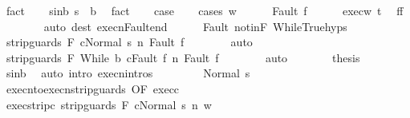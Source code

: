 \begin{isabellebody}
\ fact\isanewline
\ \ \isamarkupfalse%
\ s{\isacharunderscore}in{\isacharunderscore}b{\isacharcolon}\ {\isachardoublequoteopen}s\ {\isasymin}\ b{\isachardoublequoteclose}\ \isamarkupfalse%
\ fact\isanewline
\ \ \isamarkupfalse%
\ {\isacharquery}case\isanewline
\ \ \isamarkupfalse%
\ {\isacharparenleft}cases\ w{\isacharparenright}\isanewline
\ \ \ \ \isamarkupfalse%
\ {\isacharparenleft}Fault\ f{\isacharprime}{\isacharparenright}\isanewline
\ \ \ \ \isamarkupfalse%
\ exec{\isacharunderscore}w\ t\ \isamarkupfalse%
\ {\isachardoublequoteopen}f{\isacharprime}{\isacharequal}f{\isachardoublequoteclose}\isanewline
\ \ \ \ \ \ \isamarkupfalse%
\ {\isacharparenleft}auto\ dest{\isacharcolon}\ execn{\isacharunderscore}Fault{\isacharunderscore}end{\isacharparenright}\isanewline
\ \ \ \ \isamarkupfalse%
\ Fault\ notinF\ WhileTrue{\isachardot}hyps\ \isanewline
\ \ \ \ \isamarkupfalse%
\ {\isachardoublequoteopen}{\isasymGamma}{\isasymturnstile}{\isasymlangle}strip{\isacharunderscore}guards\ F\ c{\isacharcomma}Normal\ s{\isasymrangle}\ {\isacharequal}n{\isasymRightarrow}\ Fault\ f{\isachardoublequoteclose}\isanewline
\ \ \ \ \ \ \isamarkupfalse%
\ auto\isanewline
\ \ \ \ \isamarkupfalse%
\ \isamarkupfalse%
\ {\isachardoublequoteopen}{\isasymGamma}{\isasymturnstile}{\isasymlangle}strip{\isacharunderscore}guards\ F\ {\isacharparenleft}While\ b\ c{\isacharparenright}{\isacharcomma}Fault\ f{\isasymrangle}\ {\isacharequal}n{\isasymRightarrow}\ Fault\ f{\isachardoublequoteclose}\isanewline
\ \ \ \ \ \ \isamarkupfalse%
\ auto\isanewline
\ \ \ \ \isamarkupfalse%
\ \isamarkupfalse%
\ {\isacharquery}thesis\isanewline
\ \ \ \ \ \ \isamarkupfalse%
\ s{\isacharunderscore}in{\isacharunderscore}b\ \isamarkupfalse%
\ {\isacharparenleft}auto\ intro{\isacharcolon}\ execn{\isachardot}intros{\isacharparenright}\isanewline
\ \ \isamarkupfalse%
\isanewline
\ \ \ \ \isamarkupfalse%
\ {\isacharparenleft}Normal\ s{\isacharprime}{\isacharparenright}\isanewline
\ \ \ \ \isamarkupfalse%
\ execn{\isacharunderscore}to{\isacharunderscore}execn{\isacharunderscore}strip{\isacharunderscore}guards\ {\isacharbrackleft}OF\ exec{\isacharunderscore}c{\isacharbrackright}\ \isanewline
\ \ \ \ \isamarkupfalse%
\ exec{\isacharunderscore}strip{\isacharunderscore}c{\isacharcolon}\ {\isachardoublequoteopen}{\isasymGamma}{\isasymturnstile}{\isasymlangle}strip{\isacharunderscore}guards\ F\ c{\isacharcomma}Normal\ s{\isasymrangle}\ {\isacharequal}n{\isasymRightarrow}\ w{\isachardoublequoteclose}\isanewline

\end{isabellebody}
